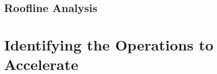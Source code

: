 \subsection{Roofline Analysis}
\label{sec:roofline-analysis}

\section{Identifying the Operations to Accelerate}
\label{sec:what-to-accelerate}
